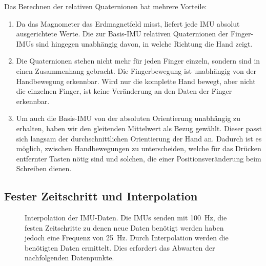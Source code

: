 Das Berechnen der relativen Quaternionen hat mehrere Vorteile:
\begin{enumerate}
    \item Da das Magnometer das Erdmagnetfeld misst, liefert jede IMU absolut ausgerichtete Werte. Die zur Basis-IMU relativen Quaternionen der Finger-IMUs sind hingegen unabhängig davon, in welche Richtung die Hand zeigt.
    \item Die Quaternionen stehen nicht mehr für jeden Finger einzeln, sondern sind in einen Zusammenhang gebracht. Die Fingerbewegung ist unabhängig von der Handbewegung erkennbar. Wird nur die komplette Hand bewegt, aber nicht die einzelnen Finger, ist keine Veränderung an den Daten der Finger erkennbar.
    \item Um auch die Basis-IMU von der absoluten Orientierung unabhängig zu erhalten, haben wir den gleitenden Mittelwert als Bezug gewählt. Dieser passt sich langsam der durchschnittlichen Orientierung der Hand an. Dadurch ist es möglich, zwischen Handbewegungen zu unterscheiden, welche für das Drücken entfernter Tasten nötig sind und solchen, die einer Positionsveränderung beim Schreiben dienen.
\end{enumerate}


\subsection{Fester Zeitschritt und Interpolation}

\begin{figure}
    \centering
    
    \caption[Interpolation der IMU-Daten]{Interpolation der IMU-Daten. Die IMUs senden mit \SI{100}{\hertz}, die festen Zeitschritte zu denen neue Daten benötigt werden haben jedoch eine Frequenz von \SI{25}{\hertz}. Durch Interpolation werden die benötigten Daten ermittelt. Dies erfordert das Abwarten der nachfolgenden Datenpunkte.}
\end{figure}


